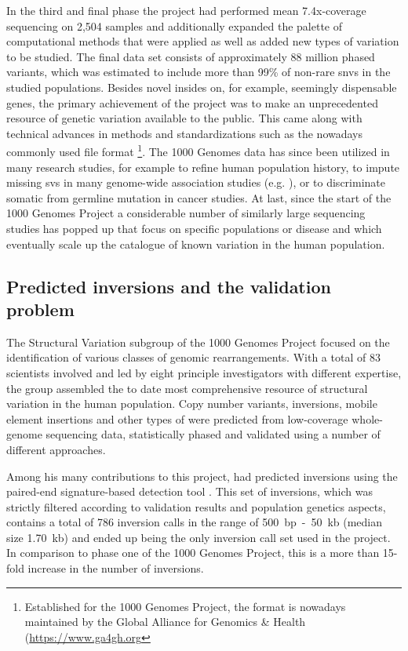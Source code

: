 In the third and final phase the project had performed mean 7.4x-coverage
sequencing on 2,504 samples and additionally expanded the palette of
computational methods that were applied as well as added new types of variation
to be studied\citep{Auton2015}. The final data set consists of approximately
88 million phased variants, which was estimated to include more than 99\% of
non-rare \acp{snv} in the studied populations. Besides novel insides on, for example,
seemingly dispensable genes, the primary achievement of the project was to make
an unprecedented resource of genetic variation available to the public. This
came along with technical advances in methods and standardizations such as the
nowadays commonly used file format \vcf\footnote{Established for the
1000 Genomes Project, the format is nowadays maintained by the Global Alliance
for Genomics \& Health (\url{https://www.ga4gh.org}}.
The 1000 Genomes data has since been utilized in many research studies, for
example to refine human population history\citep{Veeramah2014}, to
impute\citep{Howie2012} missing \acp{sv} in many genome-wide association studies
(e.g. \cite{Wood2014}), or to discriminate somatic from germline mutation in
cancer studies\citep{Hiltemann2015}. At last, since the start of the 1000
Genomes Project a considerable number of similarly large sequencing studies has
popped up that focus on specific populations\citep{UK10K,Sulem2015,Telenti2016}
or disease\citep{Campbell2017} and which eventually scale up the catalogue of
known variation in the human population.




\subsection{Predicted inversions and the validation problem}

The Structural Variation subgroup of the 1000 Genomes Project focused on the
identification of various classes of genomic rearrangements. With a total of 83
scientists involved and led by eight principle investigators with different
expertise, the group assembled the to date most comprehensive resource of
structural variation in the human population. Copy number variants, inversions,
mobile element insertions and other types of \sv were predicted from
low-coverage whole-genome sequencing data, statistically phased and
validated using a number of different approaches.

Among his many contributions to this project, \tobias had predicted inversions
using the paired-end signature-based \sv detection tool \delly. This set of
inversions, which was strictly filtered according to validation results and
population genetics aspects, contains a total of 786 inversion calls in the
range of 500~bp~-~50~kb (median size 1.70~kb) and ended up being the only
inversion call set used in the project. In comparison to phase one of the 1000
Genomes Project, this is a more than 15-fold increase in the number of
inversions.

